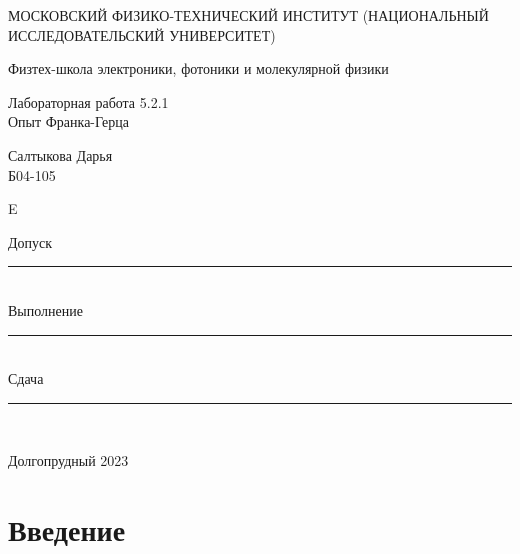 \documentclass[a4paper,12pt]{article} %
\begin{document}
\newenvironment{lines}[1][\textwidth] %
{
\newcolumntype{E}{>{}p{#1}<{\hrulefill}} %
\begin{flushright} %
\begin{tabular}[h]{E} %
}
{\end{tabular}\end{flushright}
}
	
	\begin{titlepage}
	\begin{center}
		{\large МОСКОВСКИЙ ФИЗИКО-ТЕХНИЧЕСКИЙ ИНСТИТУТ (НАЦИОНАЛЬНЫЙ ИССЛЕДОВАТЕЛЬСКИЙ УНИВЕРСИТЕТ)}
	\end{center}
	\begin{center}
		{\large Физтех-школа электроники, фотоники и молекулярной физики}
	\end{center}
	
	
	\vspace{4.5cm}
	{\huge
		\begin{center}
			{Лабораторная работа 5.2.1}\\
			Опыт Франка-Герца
		\end{center}
	}
	\vspace{2cm}
	\begin{flushright}
		{\LARGE Салтыкова Дарья \\
			\vspace{0.5cm}
			Б04-105}
	\end{flushright}
	
	\vspace{0.5cm}
	
	\begin{lines}[.5
	\textwidth]
  {\LARGE Допуск} \rule{6.5cm}{0.25pt} \vspace{0.5cm}\\
 {\LARGE Выполнение} \rule{3cm}{0.25pt}\vspace{0.5cm} \\ {\LARGE Сдача} \rule{3cm}{0.25pt} \\ %
\end{lines}
	\vspace{8cm}
	\begin{center}
		Долгопрудный 2023
	\end{center}
\end{titlepage}

\section{Введение}
\end{document}
